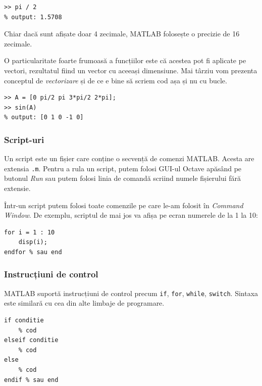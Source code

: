 \documentclass{exam}
\begin{document}
\begin{lstlisting}
>> pi / 2
% output: 1.5708
\end{lstlisting}

\par Chiar dacă sunt afișate doar 4 zecimale, MATLAB folosește o precizie de
16 zecimale.

\par O particularitate foarte frumoasă a funcțiilor este că acestea pot fi
aplicate pe vectori, rezultatul fiind un vector cu aceeași dimensiune. Mai
târziu vom prezenta conceptul de \textit{vectorizare} și de ce e bine să scriem
cod așa și nu cu bucle.

\begin{lstlisting}
>> A = [0 pi/2 pi 3*pi/2 2*pi];
>> sin(A)
% output: [0 1 0 -1 0]
\end{lstlisting}

\subsubsection{Script-uri}

\par Un script este un fișier care conține o secvență de comenzi MATLAB. Acesta
are extensia \verb|.m|. Pentru a rula un script, putem folosi GUI-ul Octave
apăsând pe butonul \textit{Run} sau putem folosi linia de comandă scriind numele
fișierului fără extensie.

\par Într-un script putem folosi toate comenzile pe care le-am folosit în
\textit{Command Window}. De exemplu, scriptul de mai jos va afișa pe ecran
numerele de la 1 la 10:

\begin{lstlisting}
for i = 1 : 10
	disp(i);
endfor % sau end
\end{lstlisting}

\subsubsection{Instrucțiuni de control}

\par MATLAB suportă instrucțiuni de control precum \verb|if|, \verb|for|,
\verb|while|, \verb|switch|. Sintaxa este similară cu cea din alte limbaje de
programare.

\begin{lstlisting}
if conditie
	% cod
elseif conditie
	% cod
else
	% cod
endif % sau end
\end{lstlisting}
\end{document}
